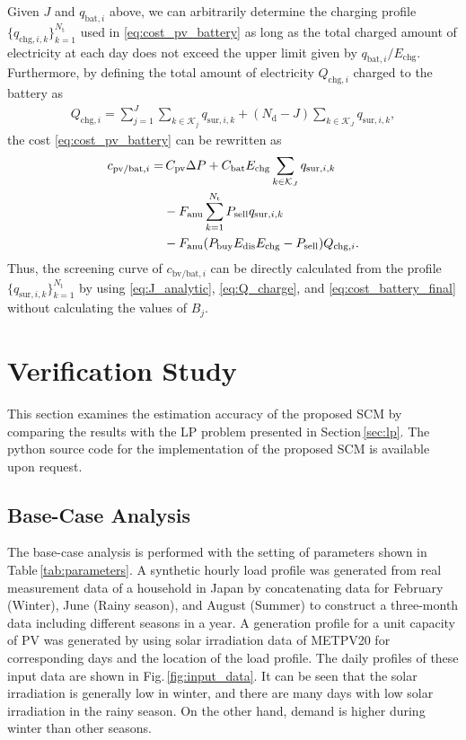 \documentclass[lettersize,journal]{IEEEtran}
\newcommand{\figref}[1]{Fig.\,\ref{#1}}
\newcommand{\tabref}[1]{Table\,\ref{#1}}
\newcommand{\secref}[1]{Section\,\ref{#1}}
\begin{document}
Given $J$ and $q_{\mathrm{bat},i}$ above, we can arbitrarily determine  the charging profile $\{  q_{\mathrm{chg}, i, k} \}_{k=1}^{N_\mathrm{t}}$ used in \eqref{eq:cost_pv_battery}  as long as the total charged amount of electricity at each day does not exceed the upper limit given by $q_{\mathrm{bat},i}/E_\mathrm{chg}$. 
Furthermore, by defining the total amount of electricity $Q_{\mathrm{chg}, i}$ charged to the battery as 
\begin{align}
 Q_{\mathrm{chg},i} =  \sum_{j=1}^{J} \sum_{k \in \mathcal{K}_j } q_{\mathrm{sur},i, k} + (N_\mathrm{d} -J) \sum_{k \in \mathcal{K}_J }  q_{\mathrm{sur},i, k},  \label{eq:Q_charge}
\end{align}
the cost \eqref{eq:cost_pv_battery} can be rewritten as 
\begin{align}
 c_{\mathrm{pv/bat},i}  = & \,
   C_\mathrm{pv}\Delta P  + C_\mathrm{bat} E_\mathrm{chg} \sum_{k \in \mathcal{K}_J} q_{\mathrm{sur}, i, k} \notag \\ 
   & - F_\mathrm{anu} \sum_{k=1}^{N_\mathrm{t}} P_{\mathrm{sell}} q_{\mathrm{sur},i,k} \notag \\
  &  - F_\mathrm{anu} (P_\mathrm{buy}  E_\mathrm{dis} E_\mathrm{chg}-P_\mathrm{sell})  Q_{\mathrm{chg},i}. 
  \label{eq:cost_battery_final}
\end{align}
Thus, the screening curve of $c_{\mathrm{bv/bat},i}$ can be directly calculated from the profile $\{q_{\mathrm{sur}, i,k} \}_{k=1}^{N_\mathrm{t}}$ by using \eqref{eq:J_analytic}, \eqref{eq:Q_charge}, and \eqref{eq:cost_battery_final} without calculating the values of $B_j$. 


\section{Verification Study} \label{sec:verification}

This section examines the estimation accuracy of the proposed SCM by comparing the results with the LP problem presented in \secref{sec:lp}. 
The python source code for the implementation of the proposed SCM is available upon request. 

\subsection{Base-Case Analysis}

The base-case analysis is performed with the setting of parameters shown in \tabref{tab:parameters}. 
A synthetic hourly load profile was generated from real measurement data of a household in Japan \cite{database} by concatenating data for February (Winter), June (Rainy season), and August (Summer) to construct a three-month data including different seasons in a year. 
A generation profile for a unit capacity of PV was generated by using solar irradiation data of METPV20 \cite{metpv20} for corresponding days and the location of the load profile. 
The daily profiles of these input data are shown in \figref{fig:input_data}. 
It can be seen that the solar irradiation is generally low in winter, and there are many days with low solar irradiation in the rainy season. 
On the other hand, demand is higher during winter than other seasons. 
\end{document}
